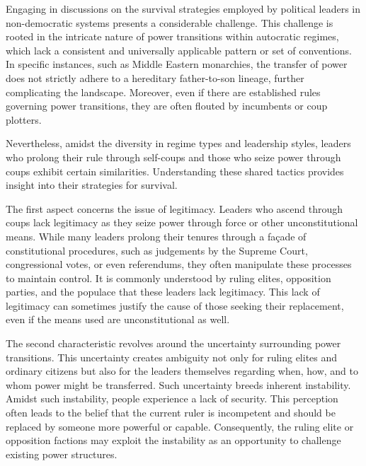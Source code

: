 \documentclass[
  12pt,
  a4paper,
  12pt]{article}
\begin{document}
Engaging in discussions on the survival strategies employed by political
leaders in non-democratic systems presents a considerable challenge.
This challenge is rooted in the intricate nature of power transitions
within autocratic regimes, which lack a consistent and universally
applicable pattern or set of conventions. In specific instances, such as
Middle Eastern monarchies, the transfer of power does not strictly
adhere to a hereditary father-to-son lineage, further complicating the
landscape. Moreover, even if there are established rules governing power
transitions, they are often flouted by incumbents or coup plotters.

Nevertheless, amidst the diversity in regime types and leadership
styles, leaders who prolong their rule through self-coups and those who
seize power through coups exhibit certain similarities. Understanding
these shared tactics provides insight into their strategies for
survival.

The first aspect concerns the issue of legitimacy. Leaders who ascend
through coups lack legitimacy as they seize power through force or other
unconstitutional means. While many leaders prolong their tenures through
a façade of constitutional procedures, such as judgements by the Supreme
Court, congressional votes, or even referendums, they often manipulate
these processes to maintain control. It is commonly understood by ruling
elites, opposition parties, and the populace that these leaders lack
legitimacy. This lack of legitimacy can sometimes justify the cause of
those seeking their replacement, even if the means used are
unconstitutional as well.

The second characteristic revolves around the uncertainty surrounding
power transitions. This uncertainty creates ambiguity not only for
ruling elites and ordinary citizens but also for the leaders themselves
regarding when, how, and to whom power might be transferred. Such
uncertainty breeds inherent instability. Amidst such instability, people
experience a lack of security. This perception often leads to the belief
that the current ruler is incompetent and should be replaced by someone
more powerful or capable. Consequently, the ruling elite or opposition
factions may exploit the instability as an opportunity to challenge
existing power structures.
\end{document}
